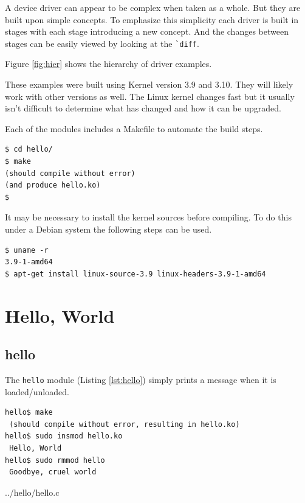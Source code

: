 \documentclass{article}
\begin{document}
A device driver can appear to be complex when taken as a whole.
But they are built upon simple concepts.
To emphasize this simplicity each driver is built in stages with
each stage introducing a new concept.
And the changes between stages can be easily viewed by looking
at the \verb+`diff+.

Figure \ref{fig:hier} shows the hierarchy of driver examples.

These examples were built using Kernel version 3.9 and 3.10.
They will likely work with other versions as well.
The Linux kernel changes fast but it usually isn't difficult to
determine what has changed and how it can be upgraded.

Each of the modules includes a Makefile to automate the build steps.

\begin{verbatim}
$ cd hello/
$ make
(should compile without error)
(and produce hello.ko)
$
\end{verbatim}

It may be necessary to install the kernel sources before compiling.
To do this under a Debian\autocite{debian} system the following steps
can be used.

\begin{verbatim}
$ uname -r
3.9-1-amd64
$ apt-get install linux-source-3.9 linux-headers-3.9-1-amd64

\end{verbatim}


\section{Hello, World}

\subsection{hello}

The \verb+hello+ module (Listing \ref{lst:hello}) simply prints a message
when it is loaded/unloaded.

\begin{verbatim}
hello$ make
 (should compile without error, resulting in hello.ko)
hello$ sudo insmod hello.ko
 Hello, World
hello$ sudo rmmod hello
 Goodbye, cruel world
\end{verbatim}


	{../hello/hello.c}
\end{document}

